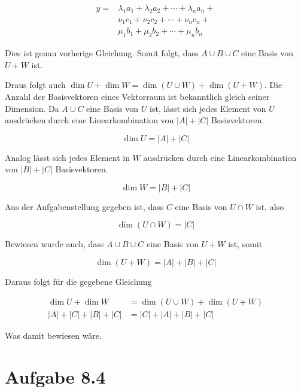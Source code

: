 \documentclass[a4paper,german,12pt,smallheadings]{scrartcl}
\begin{document}
\begin{align*}
  y = &\lambda_1a_1 + \lambda_2a_2 + \dotsb + \lambda_na_n + \\
      &\nu_1c_1     + \nu_2    c_2 + \dotsb + \nu_nc_n     + \\
      &\mu_1b_1     + \mu_2b_2     + \dotsb + \mu_nb_n
\end{align*}

Dies ist genau vorherige Gleichung. Somit folgt, dass $A \cup B \cup C$ eine Basis von $U + W$ ist.

Draus folgt auch $\dim U + \dim W = \dim(U \cup W) + \dim(U+W)$. Die Anzahl der
Basisvektoren eines Vektorraum ist bekanntlich gleich seiner Dimension. Da $A
\cup C$ eine Basis von $U$ ist, lässt sich jedes Element von $U$ ausdrücken
durch eine Linearkombination von $|A| + |C|$ Basisvektoren.

\begin{equation}
  \dim U = |A| + |C|
  \label{dim_u}
\end{equation}

Analog lässt sich jedes Element in $W$ ausdrücken durch eine Linearkombination von $|B| + |C|$ Basisvektoren.

\begin{equation}
  \dim W = |B| + |C|
  \label{dim_w}
\end{equation}

Aus der Aufgabenstellung gegeben ist, dass $C$ eine Basis von $U \cap W$ ist, also

\begin{equation}
  \dim(U \cap W) = |C|
  \label{dim_ucapw}
\end{equation}

Bewiesen wurde auch, dass $A \cup B \cup C$ eine Basis von $U + W$ ist, somit

\begin{equation}
  \dim(U + W) = |A| + |B| + |C|
  \label{dim_ucupw}
\end{equation}

Daraus folgt für die gegebene Gleichung

\begin{align*}
\dim U + \dim W &= \dim(U \cup W) + \dim(U+W) \\
|A| + |C| + |B| + |C| &= |C| + |A| + |B| + |C|
\end{align*}

Was damit bewiesen wäre.

\section{Aufgabe 8.4}
\end{document}
